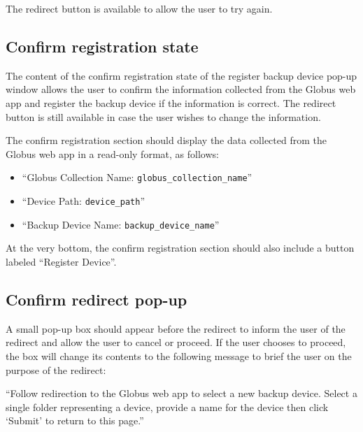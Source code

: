\noindent The redirect button is available to allow the user to try again.

\subsection{Confirm registration state}

The content of the confirm registration state of the register backup device pop-up window 
allows the user to confirm the information collected from the Globus web app and register
the backup device if the information is correct. The redirect button is still available
in case the user wishes to change the information. 

The confirm registration section should display the data collected from the Globus web app 
in a read-only format, as follows:

\begin{itemize}\itemsep1pt
    \item ``Globus Collection Name: \texttt{globus\_collection\_name}''
    \item ``Device Path: \texttt{device\_path}''
    \item ``Backup Device Name: \texttt{backup\_device\_name}''
\end{itemize}

\noindent At the very bottom, the confirm registration section should also include a button 
labeled ``Register Device''.

\subsection{Confirm redirect pop-up\label{sec:confirm-redirect-popup}}

A small pop-up box should appear before the redirect to inform the user of the redirect 
and allow the user to cancel or proceed. If the user chooses to proceed, the box will change
its contents to the following message to brief the user on the purpose of the redirect:

\vspace{3mm}
``Follow redirection to the Globus web app to select a new backup device. Select a single
folder representing a device, provide a name for the device then click `Submit' to return 
to this page.''
\vspace{3mm}